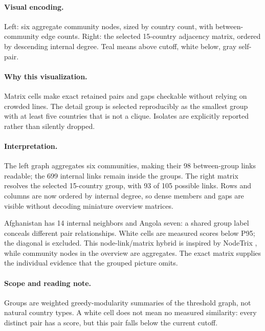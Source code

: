 \documentclass[conference,a4paper]{IEEEtran}
\begin{document}
\paragraph{Visual encoding.} Left: six aggregate community nodes, sized by country count, with between-community edge counts. Right: the selected 15-country adjacency matrix, ordered by descending internal degree. Teal means above cutoff, white below, gray self-pair.



\paragraph{Why this visualization.} Matrix cells make exact retained pairs and gaps checkable without relying on crowded lines. The detail group is selected reproducibly as the smallest group with at least five countries that is not a clique. Isolates are explicitly reported rather than silently dropped.



\paragraph{Interpretation.} The left graph aggregates six communities, making their 98 between-group links readable; the 699 internal links remain inside the groups. The right matrix resolves the selected 15-country group, with 93 of 105 possible links. Rows and columns are now ordered by internal degree, so dense members and gaps are visible without decoding miniature overview matrices.

Afghanistan has 14 internal neighbors and Angola seven: a shared group label conceals different pair relationships. White cells are measured scores below P95; the diagonal is excluded. This node-link/matrix hybrid is inspired by NodeTrix \cite{ref8}, while community nodes in the overview are aggregates. The exact matrix supplies the individual evidence that the grouped picture omits.



\paragraph{Scope and reading note.} Groups are weighted greedy-modularity summaries of the threshold graph, not natural country types. A white cell does not mean no measured similarity: every distinct pair has a score, but this pair falls below the current cutoff.
\end{document}
